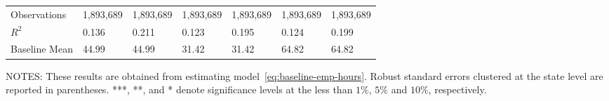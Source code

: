\begin{table}[H]
{\begin{tabular}{@{}lllllll@{}}
            Observations        & 1,893,689 & 1,893,689 & 1,893,689 & 1,893,689 & 1,893,689 & 1,893,689 \\
            $R^2$               & 0.136     & 0.211     & 0.123     & 0.195     & 0.124     & 0.199     \\
            Baseline Mean       & 44.99     & 44.99     & 31.42     & 31.42     & 64.82     & 64.82     \\ \bottomrule \bottomrule
        \end{tabular}%
    }
    \begin{minipage}{\columnwidth}
        \vspace{0.05in}
        \tiny NOTES: These results are obtained from estimating model~\ref{eq:baseline-emp-hours}. Robust standard errors clustered at the state level are reported in parentheses. ***, **, and * denote significance levels at the less than $1\%$, $5\%$ and $10\%$, respectively.
    \end{minipage}
\end{table}